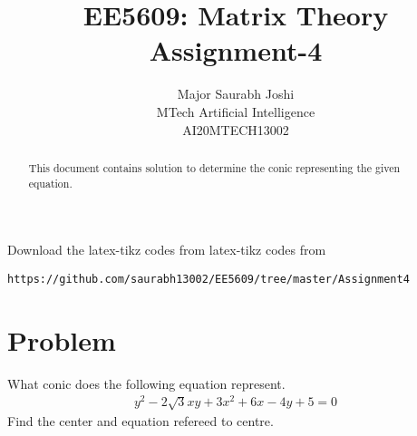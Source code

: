 \documentclass[journal,12pt,twocolumn]{IEEEtran}
\begin{document}
\makeatletter
{}
\makeatother
\let\StandardTheFigure\thefigure
\let\vec\mathbf
\renewcommand{\thefigure}{\theproblem}
\def\putbox#1#2#3{\makebox[0in][l]{\makebox[#1][l]{}\raisebox{\baselineskip}[0in][0in]{\raisebox{#2}[0in][0in]{#3}}}}
     \def\rightbox#1{\makebox[0in][r]{#1}}
     \def\centbox#1{\makebox[0in]{#1}}
     \def\topbox#1{\raisebox{-\baselineskip}[0in][0in]{#1}}
     \def\midbox#1{\raisebox{-0.5\baselineskip}[0in][0in]{#1}}
\vspace{3cm}
\title{EE5609: Matrix Theory\\
          Assignment-4\\}
\author{Major Saurabh Joshi\\MTech Artificial Intelligence\\AI20MTECH13002 }
\maketitle
\newpage
\bigskip
\renewcommand{\thefigure}{\theenumi}
\renewcommand{\thetable}{\theenumi}
\begin{abstract}
This document contains solution to determine the conic representing the given equation. 
\end{abstract}
Download the latex-tikz codes from 
%
%
latex-tikz codes from 
%
\begin{lstlisting}
https://github.com/saurabh13002/EE5609/tree/master/Assignment4
\end{lstlisting}
%
\section{Problem}
What conic does the following equation represent. 
\begin{align*}
y^2-2\sqrt{3}xy+3x^2+6x-4y+5 = 0
\end{align*}
Find the center and equation refereed to centre.
\end{document}

